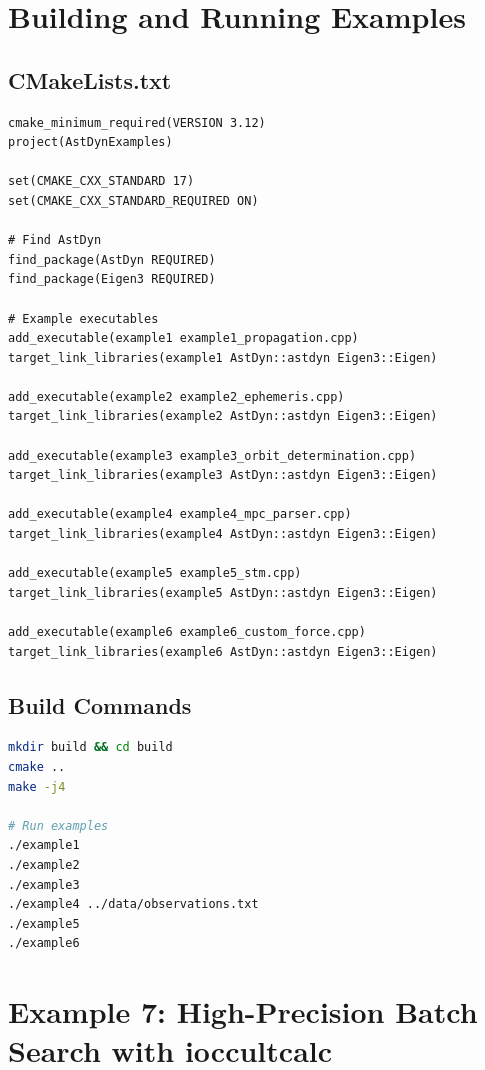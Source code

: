 \section{Building and Running Examples}

\subsection{CMakeLists.txt}

\begin{lstlisting}[caption={CMakeLists.txt for examples}]
cmake_minimum_required(VERSION 3.12)
project(AstDynExamples)

set(CMAKE_CXX_STANDARD 17)
set(CMAKE_CXX_STANDARD_REQUIRED ON)

# Find AstDyn
find_package(AstDyn REQUIRED)
find_package(Eigen3 REQUIRED)

# Example executables
add_executable(example1 example1_propagation.cpp)
target_link_libraries(example1 AstDyn::astdyn Eigen3::Eigen)

add_executable(example2 example2_ephemeris.cpp)
target_link_libraries(example2 AstDyn::astdyn Eigen3::Eigen)

add_executable(example3 example3_orbit_determination.cpp)
target_link_libraries(example3 AstDyn::astdyn Eigen3::Eigen)

add_executable(example4 example4_mpc_parser.cpp)
target_link_libraries(example4 AstDyn::astdyn Eigen3::Eigen)

add_executable(example5 example5_stm.cpp)
target_link_libraries(example5 AstDyn::astdyn Eigen3::Eigen)

add_executable(example6 example6_custom_force.cpp)
target_link_libraries(example6 AstDyn::astdyn Eigen3::Eigen)
\end{lstlisting}

\subsection{Build Commands}

\begin{lstlisting}[language=bash]
mkdir build && cd build
cmake ..
make -j4

# Run examples
./example1
./example2
./example3
./example4 ../data/observations.txt
./example5
./example6
\end{lstlisting}

\section{Example 7: High-Precision Batch Search with ioccultcalc}

